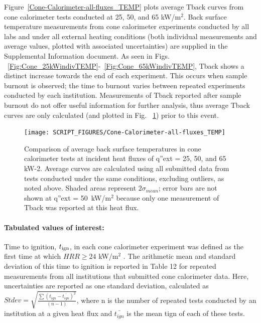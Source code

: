 \documentclass{book}
\begin{document}
Figure~\ref{Cone-Calorimeter-all-fluxes_TEMP} plots average Tback curves from cone calorimeter tests conducted at 25, 50, and 65 kW/m$^2$. Back surface temperature measurements from cone calorimeter experiments conducted by all labs and under all external heating conditions (both individual measurements and average values, plotted with associated uncertainties) are supplied in the Supplemental Information document. As seen in Figs. ~\ref{Fig:Cone_25kWindivTEMP}-~\ref{Fig:Cone_65kWindivTEMP}, Tback shows a distinct increase towards the end of each experiment. This occurs when sample burnout is observed; the time to burnout varies between repeated experiments conducted by each institution. Measurements of Tback reported after sample burnout do not offer useful information for further analysis, thus average Tback curves are only calculated (and plotted in Fig. ~\ref{Fig:Cone-Calorimeter-all-fluxes_TEMP}) prior to this event.

\begin{figure}
  \centering
  \texttt{[image: SCRIPT\_FIGURES/Cone-Calorimeter-all-fluxes\_TEMP]}
  \caption{Comparison of average back surface temperatures in cone calorimeter tests at incident heat fluxes of q”ext = 25, 50, and 65 kW-2. Average curves are calculated using all submitted data from tests conducted under the same conditions, excluding outliers, as noted above. Shaded areas represent $2\sigma_{mean}$; error bars are not shown at q”ext = 50~kW/m$^2$ because only one measurement of Tback was reported at this heat flux.}
  \label{Fig:Cone-Calorimeter-all-fluxes_TEMP}
\end{figure}


\paragraph{Tabulated values of interest:}

Time to ignition, $t_{\rm ign}$, in each cone calorimeter experiment was defined as the first time at which $HRR \ge 24$ kW/m$^2$ \cite{lyon2007criteria}. The arithmetic mean and standard deviation of this time to ignition is reported in Table 12 for repeated measurements from all institutions that submitted cone calorimeter data. Here, uncertainties are reported as one standard deviation, calculated as $Stdev=\sqrt{\frac{\sum\left(t_{ign}-\bar{t_{ign}}\right)^2}{(n-1)}}$, where n is the number of repeated tests conducted by an institution at a given heat flux and $\bar{t_{ign}}$ is the mean tign of each of these tests.
\end{document}

